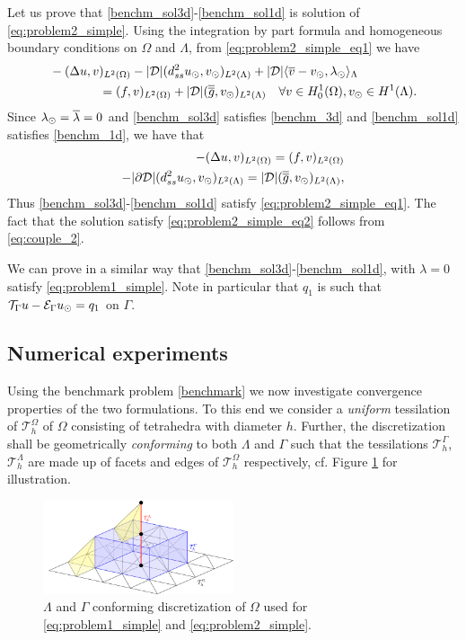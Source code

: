 Let us prove that \eqref{benchm_sol3d}-\eqref{benchm_sol1d} is solution of
\eqref{eq:problem2_simple}. Using the integration by part formula and homogeneous
boundary conditions on $\Omega$ and $\Lambda$, from \eqref{eq:problem2_simple_eq1} we have
\begin{align*}
&-(\Delta u, v)_{L^2(\Omega)} - |{\cal D}|(d^2_{ss} \ud, \vd)_{L^2(\Lambda)} 
+ |{\cal D}|\langle \avrc{v}  - \vd, \ld \rangle_\Lambda
\\
\nonumber
&\qquad\qquad= (f,v)_{L^2(\Omega)} + |{\cal D}| (\avrd{g},\vd)_{L^2(\Lambda)}
\quad \forall v \in H^1_0(\Omega), \vd \in H^1(\Lambda).
\\
\end{align*}
Since $\lambda_{\odot}=\overline{\lambda}=0$ and \eqref{benchm_sol3d} satisfies \eqref{benchm_3d} and \eqref{benchm_sol1d}
satisfies \eqref{benchm_1d}, we have that
\begin{align*}
-(\Delta u, v)_{L^2(\Omega)} =  (f,v)_{L^2(\Omega)} \\
-|{\partial \cal D}|(d^2_{ss} \ud, \vd)_{L^2(\Lambda)}  = |{\cal D}| (\avrd{g},\vd)_{L^2(\Lambda)},
\end{align*}
Thus \eqref{benchm_sol3d}-\eqref{benchm_sol1d} satisfy \eqref{eq:problem2_simple_eq1}.
The fact that the solution satisfy \eqref{eq:problem2_simple_eq2} follows from \eqref{eq:couple_2}.

We can prove in a similar way that \eqref{benchm_sol3d}-\eqref{benchm_sol1d}, with $\lambda=0$
satisfy \eqref{eq:problem1_simple}. Note in particular that $q_1$ is such that
${\mathcal{T}_\Gamma}{u} - \mathcal{E}_\Gamma{u_{\odot}} = q_1$ on $\Gamma$.

\subsection{Numerical experiments} Using the benchmark problem \eqref{benchmark}
we now investigate convergence properties of the two formulations. To this
end we consider a \emph{uniform} tessilation of $\mathcal{T}^{\Omega}_h$ of $\Omega$ consisting of
tetrahedra with diameter $h$. Further, the discretization shall be
geometrically \emph{conforming} to both $\Lambda$ and $\Gamma$ such that
the tessilations $\mathcal{T}^{\Gamma}_h$, $\mathcal{T}^{\Lambda}_h$ are made up
of facets and edges of $\mathcal{T}^{\Omega}_h$ respectively, cf. Figure \ref{fig:mesh}
for illustration.

\begin{figure}
  \begin{center}
    \includegraphics[width=0.5\textwidth]{./graphics/conform_mesh.pdf}
    \caption{$\Lambda$ and $\Gamma$ conforming discretization of $\Omega$
      used for \eqref{eq:problem1_simple} and \eqref{eq:problem2_simple}.
    }
    \label{fig:mesh}
  \end{center}
\end{figure}
  
